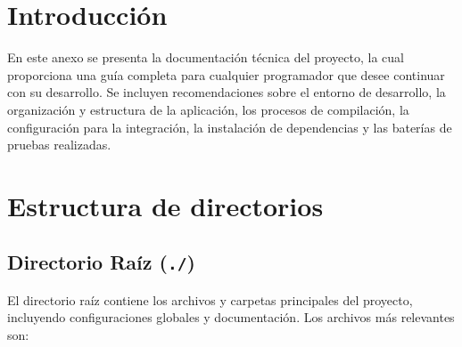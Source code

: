 
\section{Introducción}

En este anexo se presenta la documentación técnica del proyecto, la cual proporciona una guía completa para cualquier programador que desee continuar con su desarrollo. Se incluyen recomendaciones sobre el entorno de desarrollo, la organización y estructura de la aplicación, los procesos de compilación, la configuración para la integración, la instalación de dependencias y las baterías de pruebas realizadas.

\section{Estructura de directorios}


\subsection{Directorio Raíz (\texttt{./})}
El directorio raíz contiene los archivos y carpetas principales del proyecto, incluyendo configuraciones globales y documentación. Los archivos más relevantes son:

